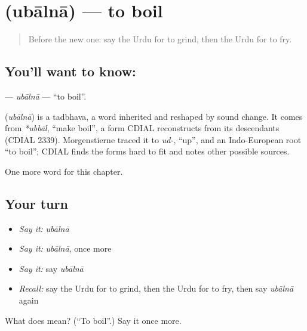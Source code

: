 \section[\texorpdfstring{\ur{ابالنا} (ubālnā)}{ابالنا (ubālnā)}]{ (ubālnā) — to boil}

\label{lesson:UR-C212-ubalna}



\begin{quote}
Before the new one: say the Urdu for to grind, then the Urdu for to fry.
\end{quote}

\subsection*{You'll want to know: }
\textbf{} — \emph{ubālnā} — \textquotedblleft{}to boil\textquotedblright{}.

\begin{cousinweb}
\textbf{} (\emph{ubālnā}) is a tadbhava, a word inherited and reshaped by sound change. It comes from \emph{*ubbāl}, \textquotedblleft{}make boil\textquotedblright{}, a form CDIAL reconstructs from its descendants (CDIAL 2339). Morgenstierne traced it to \emph{ud-}, \textquotedblleft{}up\textquotedblright{}, and an Indo-European root \textquotedblleft{}to boil\textquotedblright{}; CDIAL finds the forms hard to fit and notes other possible sources.
\end{cousinweb}

\begin{grammarlens}[title={What you've built}]
One more word for this chapter.
\end{grammarlens}

\subsection*{Your turn}
\begin{itemize}
\raggedright
  \item \emph{Say it:} \emph{ubālnā}
  \item \emph{Say it:} \emph{ubālnā}, once more
  \item \emph{Say it:} say \emph{ubālnā}
  \item \emph{Recall:} say the Urdu for to grind, then the Urdu for to fry, then say \emph{ubālnā} again
\end{itemize}

\begin{tcolorbox}[breakable,colback=teal!4,colframe=teal!35!black,title={Before you move on}]
What does  mean? (\textquotedblleft{}To boil\textquotedblright{}.) Say it once more.
\end{tcolorbox}

